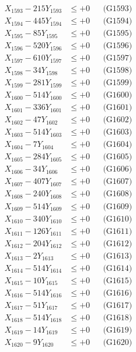 \documentclass[a4paper,10pt]{article}
\begin{document}
{\begin{align}
X_{1593} - 215Y_{1593} &\leq +0 && \text{(G1593)} \\
X_{1594} - 445Y_{1594} &\leq +0 && \text{(G1594)} \\
X_{1595} - 85Y_{1595} &\leq +0 && \text{(G1595)} \\
X_{1596} - 520Y_{1596} &\leq +0 && \text{(G1596)} \\
X_{1597} - 610Y_{1597} &\leq +0 && \text{(G1597)} \\
X_{1598} - 34Y_{1598} &\leq +0 && \text{(G1598)} \\
X_{1599} - 281Y_{1599} &\leq +0 && \text{(G1599)} \\
X_{1600} - 514Y_{1600} &\leq +0 && \text{(G1600)} \\
\allowbreak
X_{1601} - 336Y_{1601} &\leq +0 && \text{(G1601)} \\
X_{1602} - 47Y_{1602} &\leq +0 && \text{(G1602)} \\
X_{1603} - 514Y_{1603} &\leq +0 && \text{(G1603)} \\
X_{1604} - 7Y_{1604} &\leq +0 && \text{(G1604)} \\
X_{1605} - 284Y_{1605} &\leq +0 && \text{(G1605)} \\
X_{1606} - 34Y_{1606} &\leq +0 && \text{(G1606)} \\
X_{1607} - 407Y_{1607} &\leq +0 && \text{(G1607)} \\
X_{1608} - 240Y_{1608} &\leq +0 && \text{(G1608)} \\
X_{1609} - 514Y_{1609} &\leq +0 && \text{(G1609)} \\
X_{1610} - 340Y_{1610} &\leq +0 && \text{(G1610)} \\
\allowbreak
X_{1611} - 126Y_{1611} &\leq +0 && \text{(G1611)} \\
X_{1612} - 204Y_{1612} &\leq +0 && \text{(G1612)} \\
X_{1613} - 2Y_{1613} &\leq +0 && \text{(G1613)} \\
X_{1614} - 514Y_{1614} &\leq +0 && \text{(G1614)} \\
X_{1615} - 10Y_{1615} &\leq +0 && \text{(G1615)} \\
X_{1616} - 514Y_{1616} &\leq +0 && \text{(G1616)} \\
X_{1617} - 51Y_{1617} &\leq +0 && \text{(G1617)} \\
X_{1618} - 514Y_{1618} &\leq +0 && \text{(G1618)} \\
X_{1619} - 14Y_{1619} &\leq +0 && \text{(G1619)} \\
X_{1620} - 9Y_{1620} &\leq +0 && \text{(G1620)} \\

\end{align}}
\end{document}
